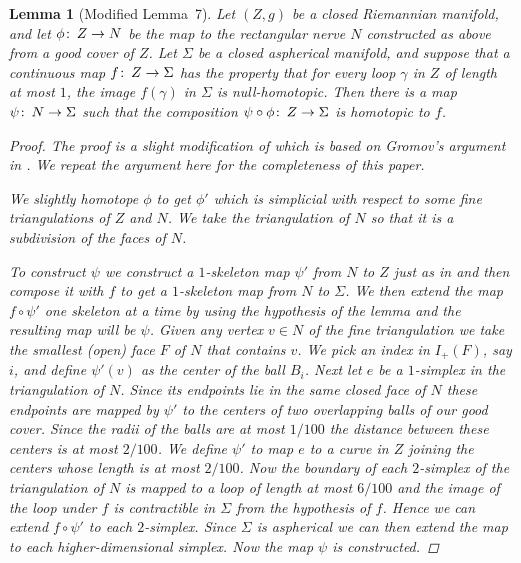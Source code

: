 \documentclass[12pt]{amsart}
\makeatletter
\newtheorem*{rep@theorem}{{Lemma} \ref##}
\newtheorem{lem}[dfn]{Lemma}
	{\newenvironment{rep{lem}}[1]{ } \begin{rep@theorem}} \end{rep@theorem}}
\numberwithin{equation}{section}
\makeatother
\begin{document}
\begin{lem}[Modified Lemma~7]\label{lem:nerve}  Let $(Z,g)$ be a closed Riemannian manifold, and let $\phi {\colon\thinspace} Z \rightarrow N$ be the map to the rectangular nerve $N$ constructed as above from a good cover of $Z$.  Let $\Sigma$ be a closed aspherical manifold, and suppose that a
 continuous map $f {\colon\thinspace}
 Z \rightarrow \Sigma$ has the property that for every loop $\gamma$ in $Z$
 of length at most $1$, the image $f(\gamma)$ in $\Sigma$ is null-homotopic.
 Then there is a map $\psi {\colon\thinspace} N \rightarrow \Sigma$ such that the
 composition $\psi \circ \phi {\colon\thinspace} Z \rightarrow \Sigma$ is homotopic to $f$.
 \begin{proof}The proof is a slight modification of
  \cite[Lemma 7]{Guth11} which is based on Gromov's argument
  in \cite{Gromov82}. We repeat the argument here for the completeness of
  this paper.

  We slightly homotope $\phi$ to get $\phi'$ which is
  simplicial with respect to some fine triangulations of $Z$ and $N$. We take
  the triangulation of $N$ so that it is a subdivision of the faces of $N$. 

  To construct $\psi$ we construct a $1$-skeleton map $\psi'$ from $N$
  to $Z$ just as in \cite{Guth11} and then compose it with $f$ to get a
  $1$-skeleton map from $N$ to $\Sigma$. We then extend the map $f\circ \psi'$ one
  skeleton at a time by using the hypothesis of the lemma and the
  resulting map will be $\psi$. Given any vertex $v\in N$ of the
  fine triangulation we take the
  smallest (open) face $F$ of $N$ that
  contains $v$. We pick an index in $I_+(F)$, say $i$, and define
  $\psi'(v)$ as the center of the ball $B_i$. Next let $e$ be a $1$-simplex
  in the triangulation of $N$. Since its endpoints lie in the same
  closed face of $N$ these endpoints are mapped by $\psi'$ to the centers of two overlapping balls of our
  good cover. Since the radii of the balls are at most $1/100$ the
  distance between these centers is at most $2/100$. We define $\psi'$
 to map $e$ to a
  curve in $Z$ joining the centers whose length is at most $2/100$.
  Now the boundary of each $2$-simplex of the triangulation of $N$ is
  mapped to a loop of length at most $6/100$ and the image of the
  loop under $f$ is contractible in $\Sigma$ from the hypothesis of $f$. Hence we can extend $f\circ
  \psi'$ to each $2$-simplex. Since $\Sigma$ is aspherical we can then extend
  the map to each higher-dimensional simplex. Now the map $\psi$ is constructed.


\end{proof}
\end{lem}
\end{document}
